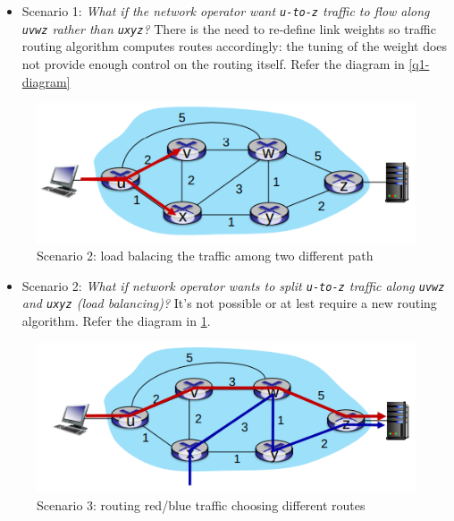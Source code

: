 \documentclass[10pt,a4paper]{report}
\theoremstyle{definition}
\begin{document}
\begin{itemize}
	\item Scenario 1: \textit{What if the network operator want \texttt{u-to-z} traffic to flow along \texttt{uvwz} rather than \texttt{uxyz}?} There is the need to re-define link weights so traffic routing algorithm computes routes accordingly: the tuning of the weight does not provide enough control on the routing itself. Refer the diagram in \ref{q1-diagram}
\end{itemize}

\begin{figure}[h]
	\centering\includegraphics[scale=0.50]{images/Pasted image 20230322110143.png}
	\caption{Scenario 2: load balacing the traffic among two different path}
	\label{q2-diagram}
\end{figure}

\begin{itemize}
	\item Scenario 2: \textit{What if network operator wants to split \texttt{u-to-z} traffic along \texttt{uvwz} and \texttt{uxyz} (load balancing)?} It's not possible or at lest require a new routing algorithm. Refer the diagram in \ref{q2-diagram}.
\end{itemize}

\begin{figure}[h]
	\centering\includegraphics[scale=0.50]{images/Pasted image 20230322110235.png}
	\caption{Scenario 3: routing red/blue traffic choosing different routes}
	\label{q3-diagram}
\end{figure}
\end{document}

